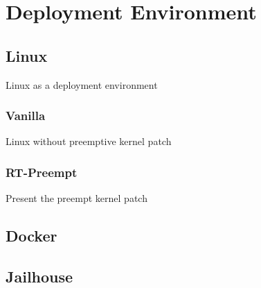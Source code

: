 \chapter{Deployment Environment}

\section{Linux}
Linux as a deployment environment
\subsection{Vanilla}
Linux without preemptive kernel patch
\subsection{RT-Preempt}
Present the preempt kernel patch

\section{Docker}

\section{Jailhouse}